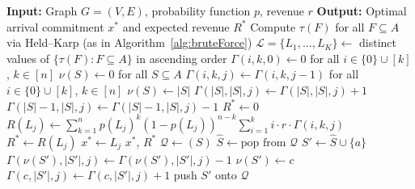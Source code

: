 \documentclass[11pt]{article}
\theoremstyle{plain}
\theoremstyle{definition}
\newcommand{\SingleSpacedXII}{}
\begin{document}
	\begin{algorithm}[htbp]
		\SingleSpacedXII
		\caption{Integrated algorithm for the \ac{TSPSC}}
		\label{alg:integrated}
		\begin{algorithmic}[1]
			\State \textbf{Input:} Graph $G = (V, E)$, probability function $p$, revenue $r$
			\State \textbf{Output:} Optimal arrival commitment $x^*$ and expected revenue $R^*$
			\Statex
			\State Compute $\tau(F)$ for all $F \subseteq A$ via Held--Karp (as in Algorithm~\ref{alg:bruteForce}) \label{line:int:phase1_start}
			\State $\mathcal{L} = \{L_1, \ldots, L_K\} \gets$ distinct values of $\{\tau(F) : F \subseteq A\}$ in ascending order
			\State $\Gamma(i, k, 0) \gets 0$ for all $i \in \{0\} \cup [k]$, $k \in [n]$ 
			\State $\nu(S) \gets 0$ for all $S \subseteq A$ 
			\State $\Gamma(i, k, j) \gets \Gamma(i, k, j-1)$ for all $i \in \{0\} \cup [k]$, $k \in [n]$ 
			 \label{line:int:update_start}
			\State $\nu(S) \gets |S|$ 
			\State $\Gamma(|S|, |S|, j) \gets \Gamma(|S|, |S|, j) + 1$
			\State $\Gamma(|S|-1, |S|, j) \gets \Gamma(|S|-1, |S|, j) - 1$ 
			\State {}
			\EndFor \label{line:int:update_end}
			\EndFor \label{line:int:phase1_end}
			\Statex
			\State $R^* \gets 0$ \label{line:int:phase2_start}
			\State $R(L_j) \gets \sum_{k=1}^{n} p(L_j)^k (1 - p(L_j))^{n-k} \sum_{i=1}^{k} i \cdot r \cdot \Gamma(i, k, j)$ \label{line:int:exp_rev}
			\State $R^* \gets R(L_j)$
			\State $x^* \gets L_j$
			\EndIf
			\EndFor
			\State \Return $x^*$, $R^*$ \label{line:int:phase2_end}
			\Statex
			 \label{line:int:prop_start}
			\State $\mathcal{Q} \gets (S)$ 
			\State $\hat{S} \gets \text{pop from } \mathcal{Q}$
			\State $S' \gets \hat{S} \cup \{a\}$
			 
			\State $\Gamma(\nu(S'), |S'|, j) \gets \Gamma(\nu(S'), |S'|, j) - 1$
			\State $\nu(S') \gets c$
			\State $\Gamma(c, |S'|, j) \gets \Gamma(c, |S'|, j) + 1$
			\State push $S'$ onto $\mathcal{Q}$
			\EndIf
			\EndFor
			\EndWhile
			\EndFunction \label{line:int:prop_end}
		\end{algorithmic}
	\end{algorithm}
	
\end{document}
